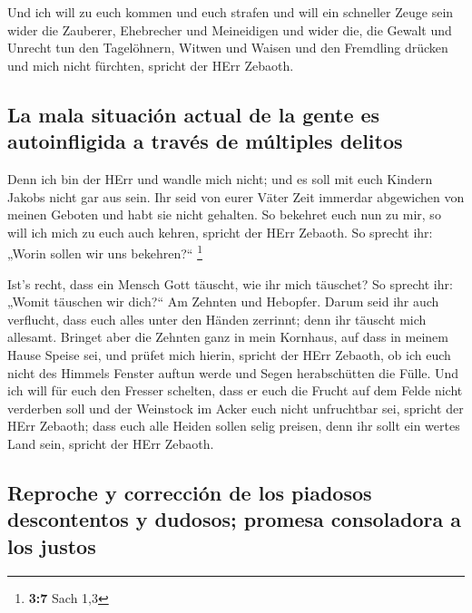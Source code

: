  Und ich will zu euch kommen und euch strafen und will ein
schneller Zeuge sein wider die Zauberer, Ehebrecher und Meineidigen und
wider die, die Gewalt und Unrecht tun den Tagelöhnern, Witwen und Waisen
und den Fremdling drücken und mich nicht fürchten, spricht der HErr
Zebaoth.

\hypertarget{la-mala-situaciuxf3n-actual-de-la-gente-es-autoinfligida-a-travuxe9s-de-muxfaltiples-delitos}{%
\subsection{La mala situación actual de la gente es autoinfligida a
través de múltiples
delitos}\label{la-mala-situaciuxf3n-actual-de-la-gente-es-autoinfligida-a-travuxe9s-de-muxfaltiples-delitos}}

 Denn ich bin der HErr und wandle mich nicht; und es soll
mit euch Kindern Jakobs nicht gar aus sein.  Ihr seid von
eurer Väter Zeit immerdar abgewichen von meinen Geboten und habt sie
nicht gehalten. So bekehret euch nun zu mir, so will ich mich zu euch
auch kehren, spricht der HErr Zebaoth. So sprecht ihr: „Worin sollen wir
uns bekehren?{}`` \footnote{\textbf{3:7} Sach 1,3}

 Ist's recht, dass ein Mensch Gott täuscht, wie ihr mich
täuschet? So sprecht ihr: „Womit täuschen wir dich?{}`` Am Zehnten und
Hebopfer.  Darum seid ihr auch verflucht, dass euch alles
unter den Händen zerrinnt; denn ihr täuscht mich allesamt.
 Bringet aber die Zehnten ganz in mein Kornhaus, auf dass
in meinem Hause Speise sei, und prüfet mich hierin, spricht der HErr
Zebaoth, ob ich euch nicht des Himmels Fenster auftun werde und Segen
herabschütten die Fülle.  Und ich will für euch den
Fresser schelten, dass er euch die Frucht auf dem Felde nicht verderben
soll und der Weinstock im Acker euch nicht unfruchtbar sei, spricht der
HErr Zebaoth;  dass euch alle Heiden sollen selig
preisen, denn ihr sollt ein wertes Land sein, spricht der HErr Zebaoth.

\hypertarget{reproche-y-correcciuxf3n-de-los-piadosos-descontentos-y-dudosos-promesa-consoladora-a-los-justos}{%
\subsection{Reproche y corrección de los piadosos descontentos y
dudosos; promesa consoladora a los
justos}\label{reproche-y-correcciuxf3n-de-los-piadosos-descontentos-y-dudosos-promesa-consoladora-a-los-justos}}


